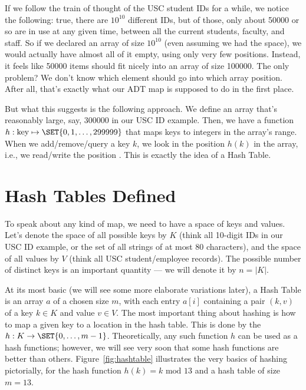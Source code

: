 If we follow the train of thought of the USC student IDs for a while,
we notice the following: true, there are $10^{10}$ different IDs, but
of those, only about 50000 or so are in use at any given time, between
all the current students, faculty, and staff. 
So if we declared an array of size $10^{10}$ (even assuming we had the
space), we would actually have almost all of it empty, using only very
few positions. Instead, it feels like 50000 items should fit
nicely into an array of size 100000.
The only problem? We don't know which element should go into which
array position. After all, that's exactly what our ADT map is
supposed to do in the first place.

But what this suggests is the following approach. We define an array
 that's reasonably large, say, 300000 in our USC ID example.
Then, we have a function $h: \text{key} \mapsto \SET{0, 1, \ldots, 299999}$
that maps keys to integers in the array's range. 
When we add/remove/query a key $k$, we look in the position $h(k)$ in
the array, i.e., we read/write the position .
This is exactly the idea of a Hash Table.

\section{Hash Tables Defined}
To speak about any kind of map, we need to have a space of
keys and values. Let's denote the space of all possible keys by $K$
(think all 10-digit IDs in our USC ID example, or the set of all
strings of at most 80 characters), and the space of all values by $V$
(think all USC student/employee records).
The possible number of distinct keys is an important quantity --- we
will denote it by $n = |K|$.

At its most basic (we will see some more elaborate variations later),
a Hash Table is an array $a$ of a chosen size $m$, with each entry
$a[i]$ containing a pair $(k, v)$ of a key $k \in K$ and value $v \in V$.
The most important thing about hashing is how to map a given key to a
location in the hash table. 
This is done by the  $h: K \to \SET{0, \ldots, m-1}$. 
Theoretically, any such function $h$ can be used as a hash functions;
however, we will see very soon that some hash functions are better
than others. 
Figure~\ref{fig:hashtable} illustrates the very basics of hashing
pictorially, for the hash function $h(k) = k \text{ mod } 13$ and a
hash table of size $m=13$.

